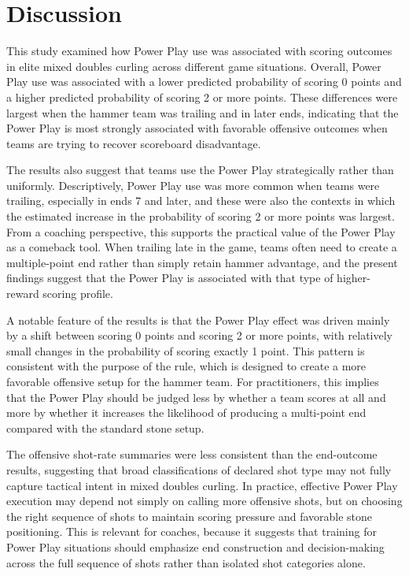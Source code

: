 \documentclass[titlepage, 12pt]{article}
\begin{document}
\section{Discussion}\label{sec:disc}

This study examined how Power Play use was associated with scoring outcomes in
elite mixed doubles curling across different game situations. Overall, Power
Play use was associated with a lower predicted probability of scoring 0 points
and a higher predicted probability of scoring 2 or more points. These
differences were largest when the hammer team was trailing and in later ends,
indicating that the Power Play is most strongly associated with favorable
offensive outcomes when teams are trying to recover scoreboard disadvantage.

The results also suggest that teams use the Power Play strategically rather
than uniformly. Descriptively, Power Play use was more common when teams were
trailing, especially in ends 7 and later, and these were also the contexts in
which the estimated increase in the probability of scoring 2 or more points was
largest. From a coaching perspective, this supports the practical value of the
Power Play as a comeback tool. When trailing late in the game, teams often need
to create a multiple-point end rather than simply retain hammer advantage, and
the present findings suggest that the Power Play is associated with that type
of higher-reward scoring profile.

A notable feature of the results is that the Power Play effect was driven
mainly by a shift between scoring 0 points and scoring 2 or more points, with
relatively small changes in the probability of scoring exactly 1 point. This
pattern is consistent with the purpose of the rule, which is designed to create
a more favorable offensive setup for the hammer team. For practitioners, this
implies that the Power Play should be judged less by whether a team scores at
all and more by whether it increases the likelihood of producing a multi-point
end compared with the standard stone setup.

The offensive shot-rate summaries were less consistent than the end-outcome
results, suggesting that broad classifications of declared shot type may not
fully capture tactical intent in mixed doubles curling. In practice, effective
Power Play execution may depend not simply on calling more offensive shots, but
on choosing the right sequence of shots to maintain scoring pressure and
favorable stone positioning. This is relevant for coaches, because it suggests
that training for Power Play situations should emphasize end construction and
decision-making across the full sequence of shots rather than isolated shot
categories alone.
\end{document}
